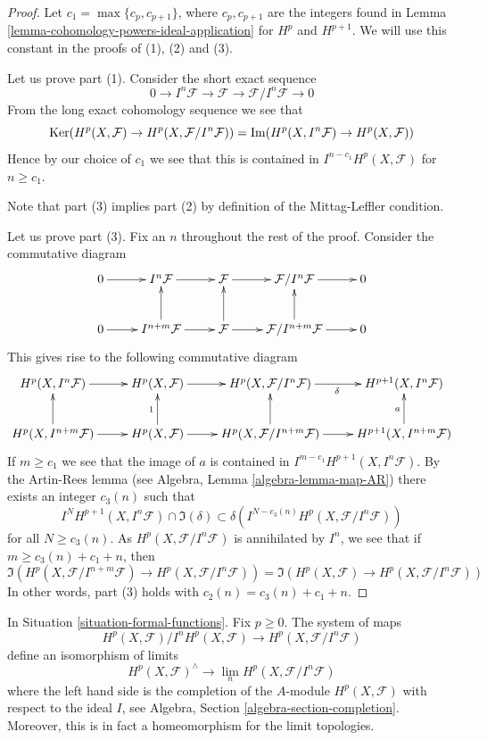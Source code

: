 \begin{proof}
Let $c_1 = \max\{c_p, c_{p + 1}\}$, where $c_p, c_{p +1}$ are the integers
found in Lemma \ref{lemma-cohomology-powers-ideal-application} for
$H^p$ and $H^{p + 1}$. We will use this constant in the proofs of
(1), (2) and (3).

\medskip\noindent
Let us prove part (1). Consider the short exact sequence
$$
0 \to I^n\mathcal{F} \to \mathcal{F} \to \mathcal{F}/I^n\mathcal{F} \to 0
$$
From the long exact cohomology sequence we see that
$$
\mathop{\mathrm{Ker}}(
H^p(X, \mathcal{F}) \to H^p(X, \mathcal{F}/I^n\mathcal{F})
)
=
\mathop{\mathrm{Im}}(
H^p(X, I^n\mathcal{F}) \to H^p(X, \mathcal{F})
)
$$
Hence by our choice of $c_1$ we see that this is contained in
$I^{n - c_1}H^p(X, \mathcal{F})$ for $n \geq c_1$.

\medskip\noindent
Note that part (3) implies part (2) by definition of the Mittag-Leffler
condition.

\medskip\noindent
Let us prove part (3).
Fix an $n$ throughout the rest of the proof.
Consider the commutative diagram
$$
\xymatrix{
0 \ar[r] &
I^n\mathcal{F} \ar[r] &
\mathcal{F} \ar[r] &
\mathcal{F}/I^n\mathcal{F} \ar[r] &
0 \\
0 \ar[r] &
I^{n + m}\mathcal{F} \ar[r] \ar[u] &
\mathcal{F} \ar[r] \ar[u] &
\mathcal{F}/I^{n + m}\mathcal{F} \ar[r] \ar[u] &
0
}
$$
This gives rise to the following commutative diagram
$$
\xymatrix{
H^p(X, I^n\mathcal{F}) \ar[r] &
H^p(X, \mathcal{F}) \ar[r] &
H^p(X, \mathcal{F}/I^n\mathcal{F}) \ar[r]_\delta &
H^{p + 1}(X, I^n\mathcal{F}) \\
H^p(X, I^{n + m}\mathcal{F}) \ar[r] \ar[u] &
H^p(X, \mathcal{F}) \ar[r] \ar[u]^1 &
H^p(X, \mathcal{F}/I^{n + m}\mathcal{F}) \ar[r] \ar[u] &
H^{p + 1}(X, I^{n + m}\mathcal{F}) \ar[u]^a
}
$$
If $m \geq c_1$ we see that the image of $a$ is
contained in $I^{m - c_1} H^{p + 1}(X, I^n\mathcal{F})$.
By the Artin-Rees lemma (see Algebra, Lemma \ref{algebra-lemma-map-AR})
there exists an integer $c_3(n)$ such that
$$
I^N H^{p + 1}(X, I^n\mathcal{F}) \cap \Im(\delta)
\subset
\delta\left(I^{N - c_3(n)}H^p(X, \mathcal{F}/I^n\mathcal{F})\right)
$$
for all $N \geq c_3(n)$. As $H^p(X, \mathcal{F}/I^n\mathcal{F})$
is annihilated by $I^n$, we see that if $m \geq c_3(n) + c_1 + n$,
then
$$
\Im(H^p(X, \mathcal{F}/I^{n + m}\mathcal{F})
\to H^p(X, \mathcal{F}/I^n\mathcal{F}))
=
\Im(H^p(X, \mathcal{F})
\to H^p(X, \mathcal{F}/I^n\mathcal{F}))
$$
In other words, part (3) holds with $c_2(n) = c_3(n) + c_1 + n$.
\end{proof}

\begin{theorem}
\label{theorem-formal-functions}
In Situation \ref{situation-formal-functions}. Fix $p \geq 0$.
The system of maps
$$
H^p(X, \mathcal{F})/I^nH^p(X, \mathcal{F})
\longrightarrow
H^p(X, \mathcal{F}/I^n\mathcal{F})
$$
define an isomorphism of limits
$$
H^p(X, \mathcal{F})^\wedge
\longrightarrow
\lim_n H^p(X, \mathcal{F}/I^n\mathcal{F})
$$
where the left hand side is the completion of the $A$-module
$H^p(X, \mathcal{F})$ with respect to the ideal $I$, see
Algebra, Section \ref{algebra-section-completion}.
Moreover, this is in fact a homeomorphism for the limit topologies.
\end{theorem}

